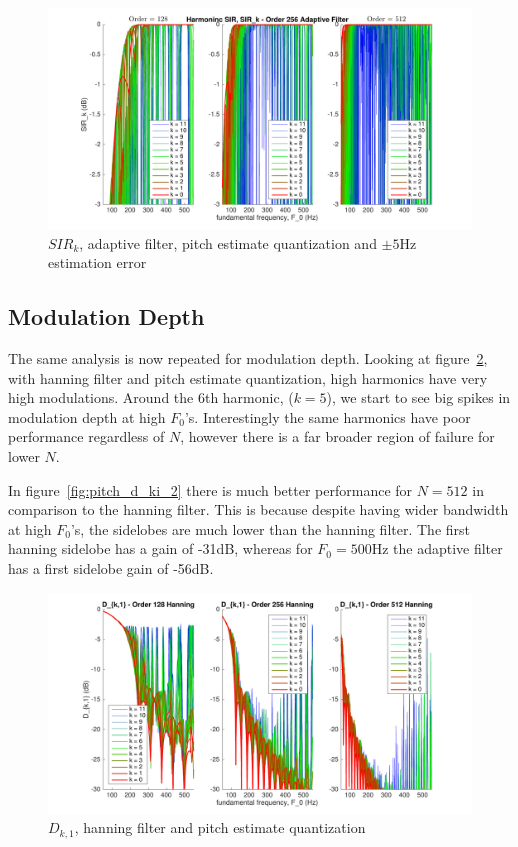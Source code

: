 \documentclass [11pt, proquest,oneside] {ganter_thesis}[2015/03/03]
\begin{document}
\begin{figure}[!ht]
  \centering
    \includegraphics[width=1\textwidth]{pitch_sir_k_2_error5}
    \caption{$SIR_k$, adaptive filter, pitch estimate quantization and $\pm5$Hz estimation error}\label{fig:pitch_sir_k_2_error5}
\end{figure}

\clearpage

\subsection{Modulation Depth}

The same analysis is now repeated for modulation depth.  Looking at figure~\ref{fig:pitch_d_ki_1}, with hanning filter and pitch estimate quantization, high harmonics have very high modulations.  Around the 6th harmonic, ($k = 5$), we start to see big spikes in modulation depth at high $F_0$'s.  Interestingly the same harmonics have poor performance regardless of $N$, however there is a far broader region of failure for lower $N$.

In  figure~\ref{fig:pitch_d_ki_2} there is much better performance for $N = 512$ in comparison to the hanning filter.  This is because despite having wider bandwidth at high $F_0$'s, the sidelobes are much lower than the hanning filter.  The first hanning sidelobe has a gain of -31dB, whereas for $F_0 = 500$Hz the adaptive filter has a first sidelobe gain of -56dB.

\begin{figure}[!ht]
  \centering
    \includegraphics[width=1\textwidth]{pitch_d_ki_1}
    \caption{$D_{k,1}$, hanning filter and pitch estimate quantization}\label{fig:pitch_d_ki_1}
\end{figure}
\end{document}
